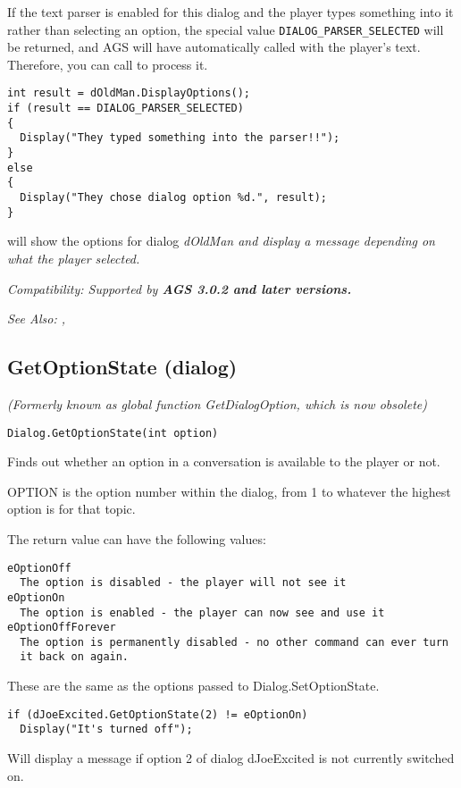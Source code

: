 If the text parser is enabled for this dialog and the player types something into
it rather than selecting an option, the special value \verb$DIALOG_PARSER_SELECTED$
will be returned, and AGS will have automatically called 
with the player's text. Therefore, you can call 
to process it.

\begin{verbatim}
int result = dOldMan.DisplayOptions();
if (result == DIALOG_PARSER_SELECTED)
{
  Display("They typed something into the parser!!");
}
else
{
  Display("They chose dialog option %d.", result);
}
\end{verbatim}
will show the options for dialog \it{dOldMan} and display a message depending
on what the player selected.

\it{Compatibility:} Supported by \bf{AGS 3.0.2} and later versions.

\it{See Also:} ,


\subsection{GetOptionState (dialog)}\label{Dialog.GetOptionState}%

\it{(Formerly known as global function GetDialogOption, which is now obsolete)}

\begin{verbatim}
Dialog.GetOptionState(int option)
\end{verbatim}
Finds out whether an option in a conversation is available to the player or
not.

OPTION is the option number within the dialog, from 1 to whatever the
highest option is for that topic.

The return value can have the following values:
\begin{verbatim}
eOptionOff
  The option is disabled - the player will not see it
eOptionOn
  The option is enabled - the player can now see and use it
eOptionOffForever
  The option is permanently disabled - no other command can ever turn
  it back on again.
\end{verbatim}
These are the same as the options passed to Dialog.SetOptionState.

\begin{verbatim}
if (dJoeExcited.GetOptionState(2) != eOptionOn)
  Display("It's turned off");
\end{verbatim}
Will display a message if option 2 of dialog dJoeExcited is not currently switched on.

